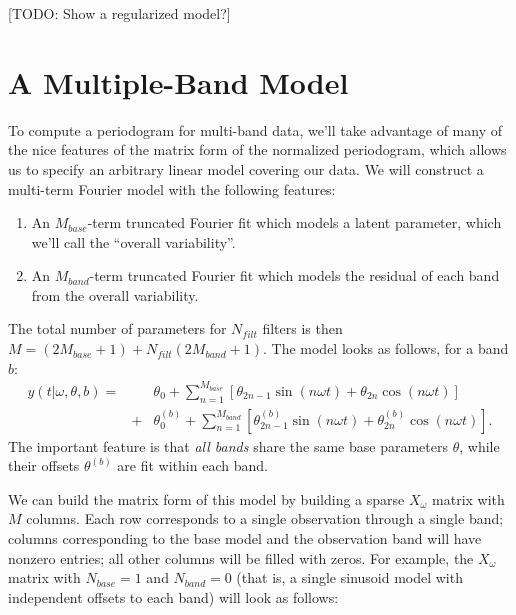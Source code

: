 \documentclass[12pt,preprint]{aastex}
\newcommand{\todo}[1]{{\color{red} [TODO: #1]}}
\begin{document}
\todo{Show a regularized model?}

\section{A Multiple-Band Model}

To compute a periodogram for multi-band data, we'll take advantage of many of the nice features of the matrix form of the normalized periodogram, which allows us to specify an arbitrary linear model covering our data. We will construct a multi-term Fourier model with the following features:
\begin{enumerate}
  \item An $M_{base}$-term truncated Fourier fit which models a latent parameter, which we'll call the ``overall variability''.
  \item An $M_{band}$-term truncated Fourier fit which models the residual of each band from the overall variability.
\end{enumerate}
The total number of parameters for $N_{filt}$ filters is then $M = (2M_{base} + 1) + N_{filt}(2M_{band} + 1)$. The model looks as follows, for a band $b$:
\begin{eqnarray}
  y(t|\omega,\theta,b) = &&\theta_0 + \sum_{n=1}^{M_{base}} \left[\theta_{2n - 1}\sin(n\omega t) + \theta_{2n}\cos(n\omega t)\right]\\ 
  &+& \theta^{(b)}_0 + \sum_{n=1}^{M_{band}} \left[\theta^{(b)}_{2n - 1}\sin(n\omega t) + \theta^{(b)}_{2n}\cos(n\omega t)\right].
\end{eqnarray}
The important feature is that {\it all bands} share the same base parameters $\theta$, while their offsets $\theta^{(b)}$ are fit within each band.

We can build the matrix form of this model by building a sparse $X_{\omega}$ matrix with $M$ columns. Each row corresponds to a single observation through a single band; columns corresponding to the base model and the observation band will have nonzero entries; all other columns will be filled with zeros. For example, the $X_\omega$ matrix with $N_{base}=1$ and $N_{band}=0$ (that is, a single sinusoid model with independent offsets to each band) will look as follows:
\end{document}
